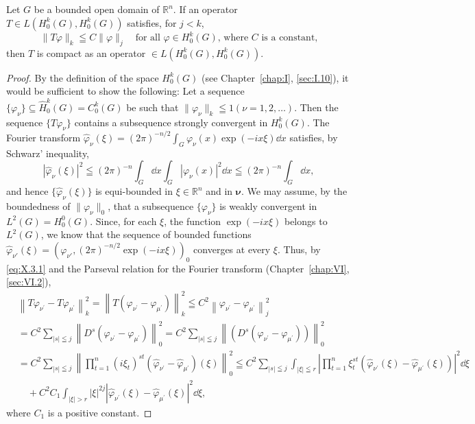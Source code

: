 \begin{theoremn} Let $G$ be a bounded open domain of $\mathbb{R}^{n}$. If an operator $T \in L(H_0^k(G), H_0^k(G))$ satisfies, for $j < k$,
\begin{equation}\label{eq:X.3.1}
\|T\varphi\|_{k} \leqq C \|\varphi\|_{j} \quad \text{for all } \varphi \in H_{0}^{k}(G) \text{, where } C \text{ is a constant,}
\end{equation}
then $T$ is compact as an operator $\in L(H_{0}^{k}(G), H_{0}^{k}(G))$. 

\end{theoremn}
\begin{proof}
 By the definition of the space $H_0^k(G)$ (see Chapter~\ref{chap:I}, \ref{sec:I.10}), it would be sufficient to show the following: Let a sequence $\{\varphi_\nu\} \subseteq \hat{H}_0^k(G) = C_0^k(G)$ be such that $\|\varphi_\nu\|_k \leqq 1 (\nu = 1,2,\ldots)$. Then the sequence $\{T\varphi_\nu\}$ contains a subsequence strongly convergent in $H_0^k(G)$. The Fourier transform $\hat{\varphi}_\nu(\xi) = (2\pi)^{-n/2} \int_G \varphi_\nu(x) \exp(-ix\xi) \dd x$ satisfies, by Schwarz' inequality, 
\[
\left| \hat {\varphi} _{\nu} (\xi) \right| ^{2} \leqq (2 \pi) ^{-n} \int_{G} \dd x \int_{G} \left| \varphi_{\nu} (x) \right| ^{2} \dd x \leqq (2 \pi) ^{-n} \int_{G} \dd x,
\]
and hence $\{\hat{\varphi}_{\nu}(\xi)\}$ is equi-bounded in $\xi\in \mathbb{R}^{n}$ and in $\pmb{\nu}$. We may assume, by the boundedness of $\|\varphi_{\nu}\|_{0}$, that a subsequence $\{\varphi_{\nu}\}$ is weakly convergent in $L^2(G) = H_0^0(G)$. Since, for each $\xi$, the function $\exp(-ix\xi)$ belongs to $L^2(G)$, we know that the sequence of bounded functions $\hat{\varphi}_{\nu'}(\xi) = (\varphi_{\nu'}, (2\pi)^{-n/2} \exp(-ix\xi))_0$ converges at every $\xi$. Thus, by \eqref{eq:X.3.1} and the Parseval relation for the Fourier transform (Chapter~\ref{chap:VI}, \ref{sec:VI.2}), 
\[
\begin{aligned}
&\left\| T \varphi_ {\nu^{\prime}} - T \varphi_ {\mu^{\prime}} \right\| _{k} ^{2} = \left\| T (\varphi_ {\nu^{\prime}} - \varphi_ {\mu^{\prime}}) \right\| _{k} ^{2} \leqq C ^{2} \left\| \varphi_ {\nu^{\prime}} - \varphi_ {\mu^{\prime}} \right\| _{j} ^{2}
\\
&= C ^{2} \sum\limits_{| s | \leqq j} \left\| D ^{s} (\varphi_ {\nu^{\prime}} - \varphi_ {\mu^{\prime}}) \right\| _{0} ^{2} = C ^{2} \sum\limits_{| s | \leqq j} \left\| (D ^{s} (\varphi_ {\nu^{\prime}} - \varphi_ {\mu^{\prime}})) \right\| _{0} ^{2}
\\
&= C ^{2} \sum\limits_{| s | \leqq j} \left\| \prod\limits_{t=1} ^{n} (i \xi_{t}) ^{st} (\hat {\varphi} _ {\nu^{\prime}} - \hat {\varphi} _ {\mu^{\prime}}) (\xi) \right\| _{0} ^{2} \leqq C ^{2} \sum\limits_{| s | \leqq j} \int_{| \xi | \leqq r} \left| \prod\limits_{t=1} ^{n} \xi_{t} ^{st} (\hat {\varphi} _ {\nu^{\prime}} (\xi) - \hat {\varphi} _ {\mu^{\prime}} (\xi)) \right| ^{2} \dd \xi
\\
&\quad + C ^{2} C _{1} \int_{| \xi | > r} | \xi | ^{2j} | \hat {\varphi} _ {\nu^{\prime}} (\xi) - \hat {\varphi} _ {\mu^{\prime}} (\xi) | ^{2} \dd \xi ,
\end{aligned}
\]
where $C_1$ is a positive constant. 


\end{proof}
